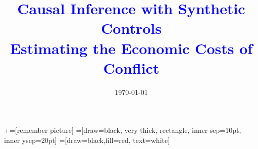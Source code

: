 \documentclass[notes,11pt, aspectratio=169]{beamer}
\title[]{\textcolor{blue}{Causal Inference with Synthetic Controls\\ Estimating the Economic Costs of Conflict }}
\institute[GSB]{\small{\begin{tabular}{c}
Alexander J. Almeida \\
Stanford Graduate School of Business\\
\end{tabular}}}
\date{\today}
\begin{document}
\newcommand\marktopleft[1]{%
    \tikz[overlay,remember picture] 
        \node (marker-#1-a) at (-.3em,.3em) {};%
}
\newcommand\markbottomright[2]{%
    \tikz[overlay,remember picture] 
        \node (marker-#1-b) at (0em,0em) {};%
}
+=[remember picture] 
 =[draw=black, very thick, rectangle, inner sep=10pt, inner ysep=20pt]
 =[draw=black,fill=red, text=white]

\begin{frame}
\maketitle
\end{frame}




% 

\end{document}
